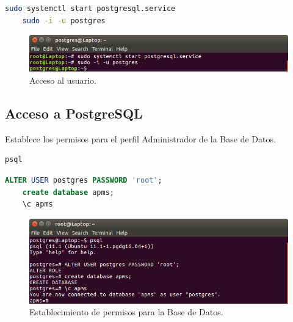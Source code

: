 \begin{lstlisting}[language=bash]
    sudo systemctl start postgresql.service
    sudo -i -u postgres
\end{lstlisting}

\begin{figure}[H]
	\begin{center}
		\includegraphics[scale=0.35]{images/INST/7.png}
		\caption{Acceso al usuario.}
	\end{center}
\end{figure}

\subsection{Acceso a PostgreSQL}

Establece los permisos para el perfil Administrador de la Base de Datos.

\begin{lstlisting}[language=bash]
    psql
\end{lstlisting}
\begin{lstlisting}[language=SQL]
    ALTER USER postgres PASSWORD 'root';
    create database apms;
    \c apms
\end{lstlisting}

\begin{figure}[H]
	\begin{center}
		\includegraphics[scale=0.35]{images/INST/8.png}
		\caption{Establecimiento de permisos para la Base de Datos.}
	\end{center}
\end{figure}